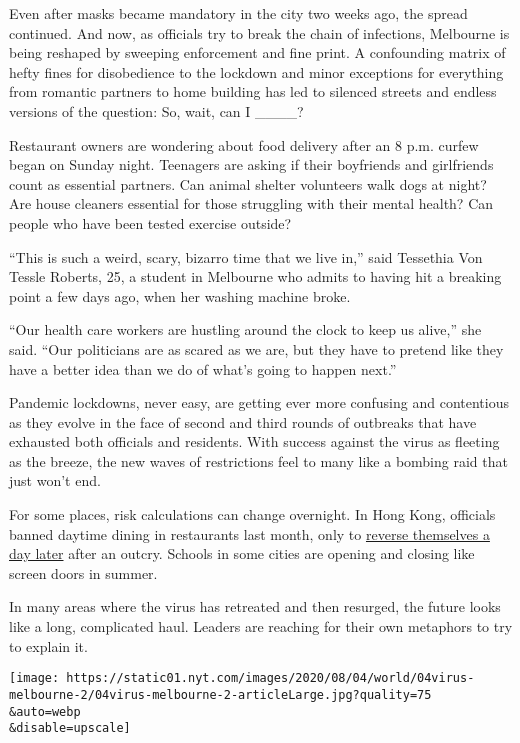Even after masks became mandatory in the city two weeks ago, the spread
continued. And now, as officials try to break the chain of infections,
Melbourne is being reshaped by sweeping enforcement and fine print. A
confounding matrix of hefty fines for disobedience to the lockdown and
minor exceptions for everything from romantic partners to home building
has led to silenced streets and endless versions of the question: So,
wait, can I \_\_\_\_?

Restaurant owners are wondering about food delivery after an 8 p.m.
curfew began on Sunday night. Teenagers are asking if their boyfriends
and girlfriends count as essential partners. Can animal shelter
volunteers walk dogs at night? Are house cleaners essential for those
struggling with their mental health? Can people who have been tested
exercise outside?

``This is such a weird, scary, bizarro time that we live in,'' said
Tessethia Von Tessle Roberts, 25, a student in Melbourne who admits to
having hit a breaking point a few days ago, when her washing machine
broke.

``Our health care workers are hustling around the clock to keep us
alive,'' she said. ``Our politicians are as scared as we are, but they
have to pretend like they have a better idea than we do of what's going
to happen next.''

Pandemic lockdowns, never easy, are getting ever more confusing and
contentious as they evolve in the face of second and third rounds of
outbreaks that have exhausted both officials and residents. With success
against the virus as fleeting as the breeze, the new waves of
restrictions feel to many like a bombing raid that just won't end.

For some places, risk calculations can change overnight. In Hong Kong,
officials banned daytime dining in restaurants last month, only to
\href{https://www.nytimes.com/2020/07/31/world/asia/hongkong-dining-lunch-coronavirus.html}{reverse
themselves a day later} after an outcry. Schools in some cities are
opening and closing like screen doors in summer.

In many areas where the virus has retreated and then resurged, the
future looks like a long, complicated haul. Leaders are reaching for
their own metaphors to try to explain it.

\texttt{[image: https://static01.nyt.com/images/2020/08/04/world/04virus-melbourne-2/04virus-melbourne-2-articleLarge.jpg?quality=75\\\&auto=webp\\\&disable=upscale]}

